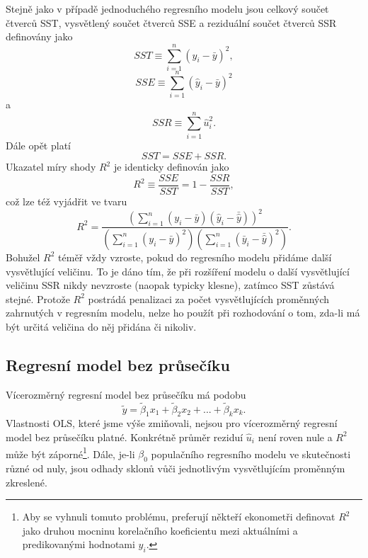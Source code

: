 Stejně jako v případě jednoduchého regresního modelu jsou 
celkový součet čtverců SST, vysvětlený součet čtverců SSE a reziduální součet čtverců SSR definovány jako
\begin{equation}
SST \equiv \sum_{i = 1}^n(y_i - \bar{y})^2,
\end{equation}
\begin{equation}
SSE \equiv \sum_{i = 1}^n (\hat{y}_i - \bar{y})^2
\end{equation}
a
\begin{equation}
SSR \equiv \sum_{i = 1}^n \hat{u}_i^2.
\end{equation}
Dále opět platí
\begin{equation}
SST = SSE + SSR.
\end{equation}
Ukazatel míry shody $R^2$ je identicky definován jako
\begin{equation}
R^2 \equiv \frac{SSE}{SST} = 1 - \frac{SSR}{SST},
\end{equation}
což lze též vyjádřit ve tvaru
\begin{equation}
R^2 = \frac{\left(\sum_{i = 1}^n (y_i - \bar{y})(\hat{y}_i - \bar{\hat{y}})\right)^2}{\left(\sum_{i = 1}^n(y_i - 
\bar{y})^2\right)\left(\sum_{i = 1}^n (\bar{y}_i - \bar{\hat{y}})^2\right)}.
\end{equation}
Bohužel $R^2$ téměř vždy vzroste, pokud do regresního modelu přidáme další vysvětlující veličinu. To je 
dáno tím, že při rozšíření modelu o další vysvětlující veličinu SSR nikdy nevzroste (naopak typicky klesne), zatímco SST 
zůstává  stejné. Protože $R^2$ postrádá penalizaci za počet vysvětlujících proměnných zahrnutých v regresním 
modelu, nelze ho použít při rozhodování o tom, zda-li má být určitá veličina do něj přidána či nikoliv.

\subsection{Regresní model bez průsečíku}

Vícerozměrný regresní model bez průsečíku má podobu
\begin{equation}
\tilde{y} = \tilde{\beta}_1 x_1 + \tilde{\beta}_2 x_2 + ... + \tilde{\beta}_k x_k.
\end{equation}
Vlastnosti OLS, které jsme výše zmiňovali, nejsou pro vícerozměrný regresní model bez průsečíku platné. Konkrétně průměr 
reziduí $\hat{u}_i$ není roven nule a $R^2$ může být záporné\footnote{Aby se vyhnuli tomuto problému, 
preferují někteří ekonometři definovat $R^2$ jako druhou mocninu korelačního koeficientu mezi aktuálními a 
predikovanými hodnotami $y_i$.}. Dále, je-li $\beta_0$ populačního regresního modelu ve skutečnosti různé od 
nuly, jsou odhady sklonů vůči jednotlivým vysvětlujícím proměnným zkreslené.

